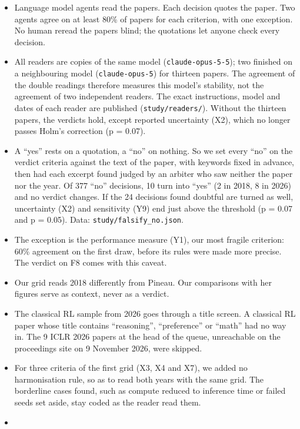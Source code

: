 \documentclass[11pt,a4paper]{article}
\providecommand{\tightlist}{\setlength{\itemsep}{0pt}\setlength{\parskip}{0pt}}
\begin{document}
\begin{itemize}
\tightlist
\item
  Language model agents read the papers. Each decision quotes the paper.
  Two agents agree on at least 80\% of papers for each criterion, with
  one exception. No human reread the papers blind; the quotations let
  anyone check every decision.
\item
  All readers are copies of the same model (\texttt{claude-opus-5-5});
  two finished on a neighbouring model (\texttt{claude-opus-5}) for
  thirteen papers. The agreement of the double readings therefore
  measures this model's stability, not the agreement of two independent
  readers. The exact instructions, model and dates of each reader are
  published (\texttt{study/readers/}). Without the thirteen papers, the
  verdicts hold, except reported uncertainty (X2), which no longer
  passes Holm's correction (p = 0.07).
\item
  A ``yes'' rests on a quotation, a ``no'' on nothing. So we set every
  ``no'' on the verdict criteria against the text of the paper, with
  keywords fixed in advance, then had each excerpt found judged by an
  arbiter who saw neither the paper nor the year. Of 377 ``no''
  decisions, 10 turn into ``yes'' (2 in 2018, 8 in 2026) and no verdict
  changes. If the 24 decisions found doubtful are turned as well,
  uncertainty (X2) and sensitivity (Y9) end just above the threshold (p
  = 0.07 and p = 0.05). Data: \texttt{study/falsify\_no.json}.
\item
  The exception is the performance measure (Y1), our most fragile
  criterion: 60\% agreement on the first draw, before its rules were
  made more precise. The verdict on F8 comes with this caveat.
\item
  Our grid reads 2018 differently from Pineau. Our comparisons with her
  figures serve as context, never as a verdict.
\item
  The classical RL sample from 2026 goes through a title screen. A
  classical RL paper whose title contains ``reasoning'', ``preference''
  or ``math'' had no way in. The 9 ICLR 2026 papers at the head of the
  queue, unreachable on the proceedings site on 9 November 2026, were
  skipped.
\item
  For three criteria of the first grid (X3, X4 and X7), we added no
  harmonisation rule, so as to read both years with the same grid. The
  borderline cases found, such as compute reduced to inference time or
  failed seeds set aside, stay coded as the reader read them.
\item

\end{itemize}
\end{document}

